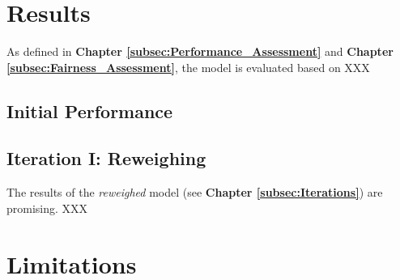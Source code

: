 \section{Results}\label{sec:Results}        

As defined in \textbf{Chapter \ref{subsec:Performance_Assessment}} and \textbf{Chapter \ref{subsec:Fairness_Assessment}}, the model is evaluated based on XXX



\subsection{Initial Performance}\label{subsec:Initial_Performance}


\subsection{Iteration I: Reweighing}\label{subsec:Iteration_I}

The results of the \textit{reweighed} model (see \textbf{Chapter \ref{subsec:Iterations}}) are promising. XXX


\section{Limitations}\label{sec:Limitations}